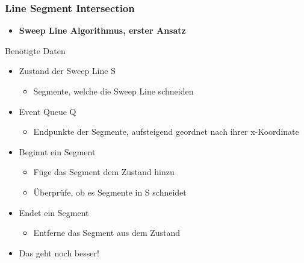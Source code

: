 \begin{frame}
	\frametitle{{Line Segment Intersection}}
	\begin{itemize}
		\item \textbf{Sweep Line Algorithmus, erster Ansatz}
		\pause
	\end{itemize}
	\begin{block}{Ben\"otigte Daten}
		\begin{itemize}
			\item Zustand der Sweep Line S
			\begin{itemize}
				\item Segmente, welche die Sweep Line schneiden
			\end{itemize}
			\pause
			\item Event Queue Q
			\begin{itemize}
				\item Endpunkte der Segmente, aufsteigend geordnet nach ihrer x-Koordinate
			\end{itemize}
		\end{itemize}
	\end{block}
	\begin{itemize}
		\pause
		\item Beginnt ein Segment
		\begin{itemize}
			\pause		
			\item F\"uge das Segment dem Zustand hinzu
			\pause
			\item \"Uberpr\"ufe, ob es Segmente in S schneidet
		\end{itemize}
		\pause
		\item Endet ein Segment
		\begin{itemize}
			\pause
			\item Entferne das Segment aus dem Zustand
		\end{itemize}
		\pause
		\item Das geht noch besser!
	\end{itemize}
\end{frame}
